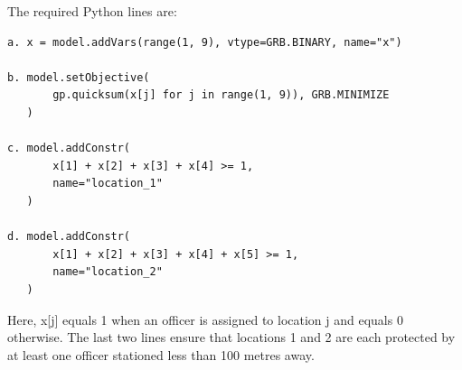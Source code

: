 \documentclass[12pt]{article}
\begin{document}
The required Python lines are:

\begin{verbatim}
a. x = model.addVars(range(1, 9), vtype=GRB.BINARY, name="x")

b. model.setObjective(
       gp.quicksum(x[j] for j in range(1, 9)), GRB.MINIMIZE
   )

c. model.addConstr(
       x[1] + x[2] + x[3] + x[4] >= 1,
       name="location_1"
   )

d. model.addConstr(
       x[1] + x[2] + x[3] + x[4] + x[5] >= 1,
       name="location_2"
   )
\end{verbatim}

Here, x[j] equals 1 when an officer is assigned to location j and equals 0
otherwise. The last two lines ensure that locations 1 and 2 are each protected
by at least one officer stationed less than 100 metres away.
\end{document}
